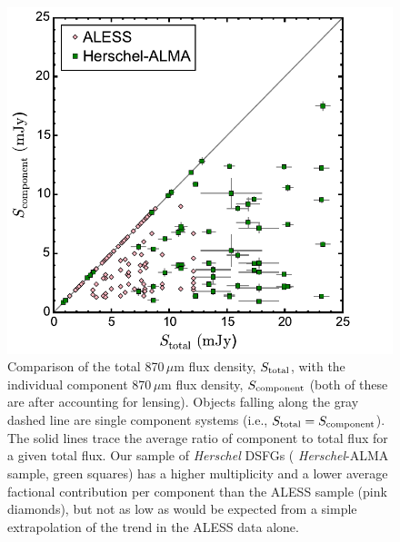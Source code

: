\documentclass[iop]{emulateapj}
\begin{document}
\begin{figure}[!tbp] 
\includegraphics[width=\linewidth]{fluxtotalcomponent.pdf}

\caption{ Comparison of the total 870$\,\mu$m flux density, $S_{\rm total}$,
with the individual component 870$\,\mu$m flux density, $S_{\rm component}$
(both of these are after accounting for lensing).  Objects falling along the
gray dashed line are single component systems (i.e., $S_{\rm total} = S_{\rm
component}$).  The solid lines trace the average ratio of component to total
flux for a given total flux.  Our sample of {\it Herschel} DSFGs ({\it
Herschel}-ALMA sample,
green squares) has a higher multiplicity and a lower average factional
contribution per component than the ALESS sample (pink diamonds), but not as
low as would be expected from a simple extrapolation of the trend in the ALESS
data alone.} \label{fig:componentflux}

\end{figure}

\end{document}
